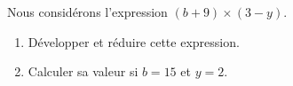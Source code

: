 
\begin{exercice}\label{exo2smath-0235}

    Nous considérons l'expression \( (b+9)\times (3-y)\).
    \begin{enumerate}
        \item
            Développer et réduire cette expression.
        \item
            Calculer sa valeur si \( b=15\) et \( y=2\).
    \end{enumerate}

\end{exercice}
